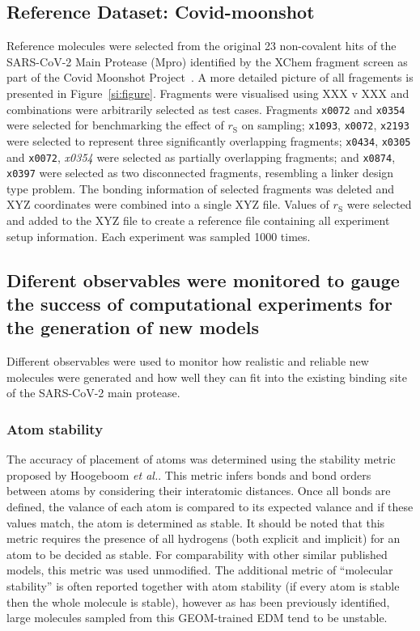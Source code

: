 \documentclass[journal=jacsat,manuscript=article]{achemso}
\begin{document}
\subsection{Reference Dataset: Covid-moonshot}
Reference molecules were selected from the original 23 non-covalent hits of the SARS-CoV-2 Main Protease (Mpro) identified by the XChem fragment screen as part of the Covid Moonshot Project~\cite{moonshot}. A more detailed picture of all fragements is presented in Figure~\ref{si:figure}. Fragments were visualised using XXX v XXX and combinations were arbitrarily selected as test cases. Fragments \texttt{x0072} and \texttt{x0354} were selected for benchmarking the effect of $r_{\mathrm{S}}$ on sampling; \texttt{x1093}, \texttt{x0072}, \texttt{x2193} were selected to represent three significantly overlapping fragments; \texttt{x0434}, \texttt{x0305} and \texttt{x0072}, \textit{x0354} were selected as partially overlapping fragments; and \texttt{x0874}, \texttt{x0397} were selected as two disconnected fragments, resembling a linker design type problem. The bonding information of selected fragments was deleted and XYZ coordinates were combined into a single XYZ file. Values of $r_{\mathrm{S}}$ were selected and added to the XYZ file to create a reference file containing all experiment setup information. Each experiment was sampled 1000 times. 

\subsection{Diferent observables were monitored to gauge the success of computational experiments for the generation of new models}

Different observables were used to monitor how realistic and reliable new molecules were generated and how well they can fit into the existing binding site of the SARS-CoV-2 main protease. 

\subsubsection{Atom stability}
The accuracy of placement of atoms was determined using the stability metric proposed by Hoogeboom \textit{et al.}. This metric infers bonds and bond orders between atoms by considering their interatomic distances. Once all bonds are defined, the valance of each atom is compared to its expected valance and if these values match, the atom is determined as stable. It should be noted that this metric requires the presence of all hydrogens (both explicit and implicit) for an atom to be decided as stable. For comparability with other similar published models, this metric was used unmodified. The additional metric of “molecular stability” is often reported together with atom stability (if every atom is stable then the whole molecule is stable), however as has been previously identified, large molecules sampled from this GEOM-trained EDM tend to be unstable.
\end{document}
